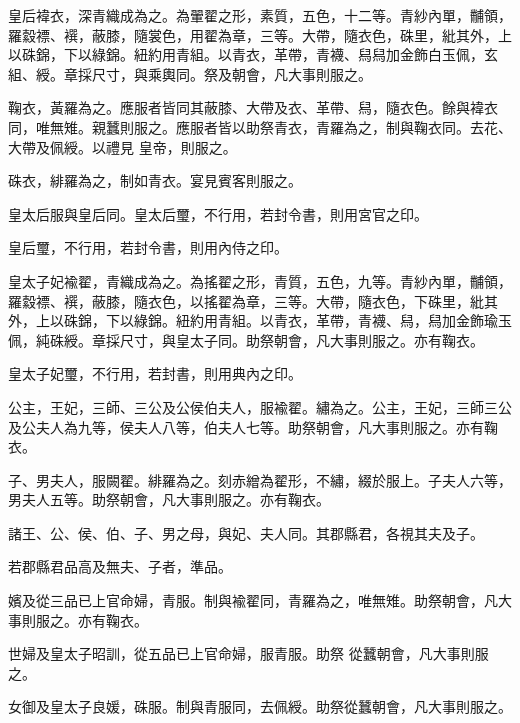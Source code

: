 \begin{pinyinscope}
 皇后褘衣，深青織成為之。為翬翟之形，素質，五色，十二等。青紗內單，黼領，羅縠褾、襈，蔽膝，隨裳色，用翟為章，三等。大帶，隨衣色，硃里，紕其外，上以硃錦，下以綠錦。紐約用青組。以青衣，革帶，青襪、舄舄加金飾白玉佩，玄組、綬。章採尺寸，與乘輿同。祭及朝會，凡大事則服之。



 鞠衣，黃羅為之。應服者皆同其蔽膝、大帶及衣、革帶、舄，隨衣色。餘與褘衣同，唯無雉。親蠶則服之。應服者皆以助祭青衣，青羅為之，制與鞠衣同。去花、大帶及佩綬。以禮見
 皇帝，則服之。



 硃衣，緋羅為之，制如青衣。宴見賓客則服之。



 皇太后服與皇后同。皇太后璽，不行用，若封令書，則用宮官之印。



 皇后璽，不行用，若封令書，則用內侍之印。



 皇太子妃褕翟，青織成為之。為搖翟之形，青質，五色，九等。青紗內單，黼領，羅縠褾、襈，蔽膝，隨衣色，以搖翟為章，三等。大帶，隨衣色，下硃里，紕其外，上以硃錦，下以綠錦。紐約用青組。以青衣，革帶，青襪、舄，舄加金飾瑜玉佩，純硃綬。章採尺寸，與皇太子同。助祭朝會，凡大事則服之。亦有鞠衣。



 皇太子妃璽，不行用，若封書，則用典內之印。



 公主，王妃，三師、三公及公侯伯夫人，服褕翟。繡為之。公主，王妃，三師三公及公夫人為九等，侯夫人八等，伯夫人七等。助祭朝會，凡大事則服之。亦有鞠衣。



 子、男夫人，服闕翟。緋羅為之。刻赤繒為翟形，不繡，綴於服上。子夫人六等，男夫人五等。助祭朝會，凡大事則服之。亦有鞠衣。



 諸王、公、侯、伯、子、男之母，與妃、夫人同。其郡縣君，各視其夫及子。



 若郡縣君品高及無夫、子者，準品。



 嬪及從三品已上官命婦，青服。制與褕翟同，青羅為之，唯無雉。助祭朝會，凡大事則服之。亦有鞠衣。



 世婦及皇太子昭訓，從五品已上官命婦，服青服。助祭
 從蠶朝會，凡大事則服之。



 女御及皇太子良媛，硃服。制與青服同，去佩綬。助祭從蠶朝會，凡大事則服之。




\end{pinyinscope}
